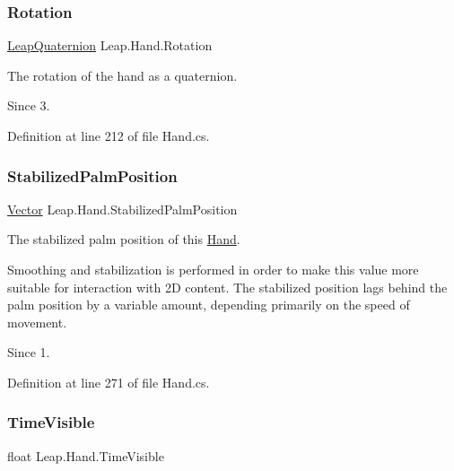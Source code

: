 \subsubsection{\texorpdfstring{Rotation}{Rotation}}
{\footnotesize\ttfamily \mbox{\hyperlink{struct_leap_1_1_leap_quaternion}{Leap\+Quaternion}} Leap.\+Hand.\+Rotation}



The rotation of the hand as a quaternion. 

\begin{DoxySince}{Since}
3. 
\end{DoxySince}


Definition at line 212 of file Hand.\+cs.

\mbox{\label{class_leap_1_1_hand_a79b70c3a70eb0b81f56a73ed4035d545}} 
\subsubsection{\texorpdfstring{StabilizedPalmPosition}{StabilizedPalmPosition}}
{\footnotesize\ttfamily \mbox{\hyperlink{struct_leap_1_1_vector}{Vector}} Leap.\+Hand.\+Stabilized\+Palm\+Position}



The stabilized palm position of this \mbox{\hyperlink{class_leap_1_1_hand}{Hand}}. 

Smoothing and stabilization is performed in order to make this value more suitable for interaction with 2D content. The stabilized position lags behind the palm position by a variable amount, depending primarily on the speed of movement. \begin{DoxySince}{Since}
1. 
\end{DoxySince}


Definition at line 271 of file Hand.\+cs.

\mbox{\label{class_leap_1_1_hand_a880d68f1c1677ed4e8a8a3fe17370d1f}} 
\subsubsection{\texorpdfstring{TimeVisible}{TimeVisible}}
{\footnotesize\ttfamily float Leap.\+Hand.\+Time\+Visible}



